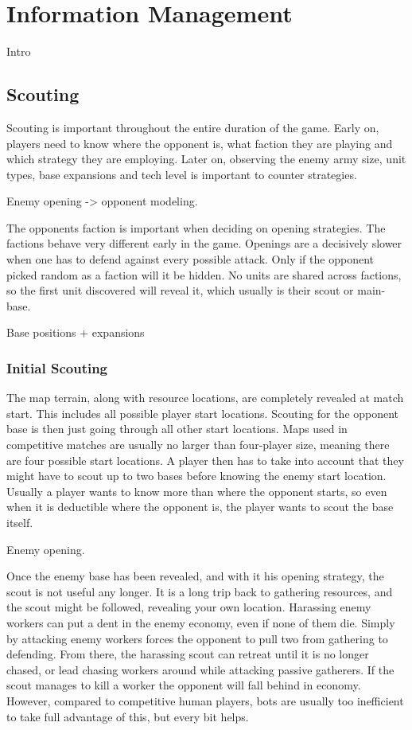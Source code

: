 \chapter{Information Management}

Intro

\section{Scouting}
Scouting is important throughout the entire duration of the game. Early on, players need to know where the opponent is, what faction they are playing and which strategy they are employing. Later on, observing the enemy army size, unit types, base expansions and tech level is important to counter strategies.

Enemy opening -> opponent modeling.

The opponents faction is important when deciding on opening strategies. The factions behave very different early in the game. Openings are a decisively slower when one has to defend against every possible attack. Only if the opponent picked random as a faction will it be hidden. No units are shared across factions, so the first unit discovered will reveal it, which usually is their scout or main-base.

Base positions + expansions

	\subsection{Initial Scouting}

	The map terrain, along with resource locations, are completely revealed at match start. This includes all possible player start locations. Scouting for the opponent base is then just going through all other start locations. Maps used in competitive matches are usually no larger than four-player size, meaning there are four possible start locations. A player then has to take into account that they might have to scout up to two bases before knowing the enemy start location. Usually a player wants to know more than where the opponent starts, so even when it is deductible where the opponent is, the player wants to scout the base itself.
	
	Enemy opening.
	
	Once the enemy base has been revealed, and with it his opening strategy, the scout is not useful any longer. It is a long trip back to gathering resources, and the scout might be followed, revealing your own location. Harassing enemy workers can put a dent in the enemy economy, even if none of them die. Simply by attacking enemy workers forces the opponent to pull two from gathering to defending. From there, the harassing scout can retreat until it is no longer chased, or lead chasing workers around while attacking passive gatherers. If the scout manages to kill a worker the opponent will fall behind in economy. However, compared to competitive human players, bots are usually too inefficient to take full advantage of this, but every bit helps.
	
